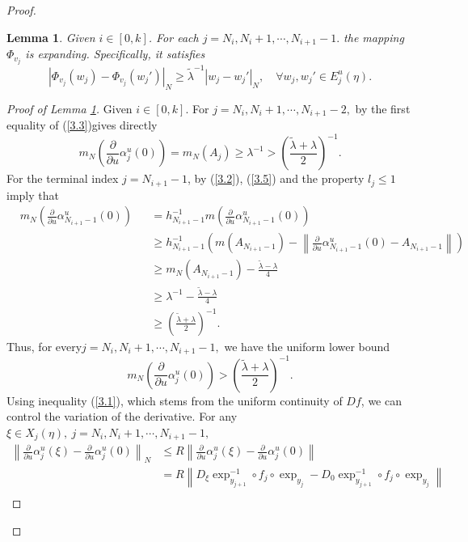\documentclass[12pt]{article}
\newtheorem{lemma}{Lemma}[section]
\begin{document}
\begin{proof}
	\begin{lemma}\label{lem:3.2} Given $ i\in [0,k] $. For each $j=N_{i},N_{i}+1,\cdots,N_{i+1}-1.$ the mapping $\Phi_{v_j}$ is expanding. Specifically, it satisfies
		$$|\Phi_{v_j}(w_j) - \Phi_{v_j}(w_j')|_N \geqslant \widetilde{\lambda}^{-1} |w_j - w_j'|_N, \quad \forall w_j, w_j' \in E_{j}^u(\eta).$$ 
	\end{lemma}
	\begin{proof}[Proof of Lemma \ref{lem:3.2}]
		Given $ i\in [0,k] $. For $ j=N_{i},N_{i}+1,\cdots,N_{i+1}-2, $ by the first equality of (\ref{3.3})gives directly
		$$
		m_N\left(\frac{\partial}{\partial u} \alpha_j^u(0)\right)= m_N(A_{j})\geqslant  \lambda^{-1}> (\frac{{\widetilde{\lambda}+\lambda}}{2}) ^{-1}. 
		$$
		For the terminal index $ j=N_{i+1}-1 $, by (\ref{3.2}), (\ref{3.5}) and the property $ l_{j}\leqslant 1 $ imply that
		$$\begin{alignedat}{2}
			&m_N\left(\frac{\partial}{\partial u} \alpha_{N_{i+1}-1}^u(0)\right)& &= h^{-1}_{N_{i+1}-1} m\left(\frac{\partial}{\partial u} \alpha_{N_{i+1}-1}^u(0)\right) \\
			& &&\geqslant h^{-1}_{N_{i+1}-1} \left(m(A_{N_{i+1}-1 })-\left\|\frac{\partial}{\partial u} \alpha_{N_{i+1}-1}^u(0) -A_{N_{i+1}-1 }\right\|\right)\\
			& &&\geqslant   m_N(A_{N_{i+1}-1 })-\frac{\widetilde\lambda-\lambda}{4} \\
			& &&\geqslant    {\lambda}^{-1} -\frac{\widetilde\lambda-\lambda}{4}\\
			& && \geqslant (\frac{{\widetilde{\lambda}+\lambda}}{2}) ^{-1}.
		\end{alignedat}
		$$
		Thus, for every​$ j=N_{i},N_{i}+1,\cdots,N_{i+1}-1, $ we have the uniform lower bound 
		$$
		m_N\left(\frac{\partial}{\partial u} \alpha_j^u(0)\right)> (\frac{{\widetilde{\lambda}+\lambda}}{2}) ^{-1}. 
		$$
		Using inequality (\ref{3.1}), which stems from the uniform continuity of $ Df $, we can control the variation of the derivative. For any $ \xi \in X_{j}(\eta),\  j=N_{i},N_{i}+1,\cdots,N_{i+1}-1,$
		\begin{equation}
			\begin{aligned}
				\left\|\frac{\partial}{\partial u} \alpha_j^u(\xi)- \frac{\partial}{\partial u} \alpha_j^u(0) \right\|_N
				&\leqslant R \left\|\frac{\partial}{\partial u} \alpha_j^u(\xi)- \frac{\partial}{\partial u} \alpha_j^u(0) \right\|\\
				&=R \left\|D_\xi \exp _{y_{j+1}}^{-1} \circ f_j \circ \exp _{y_j} -D_0 \exp _{y_{j+1}}^{-1} \circ f_j \circ \exp _{y_j}  \right\|\\

\end{aligned}
\end{equation}
\end{proof}
\end{proof}
\end{document}
